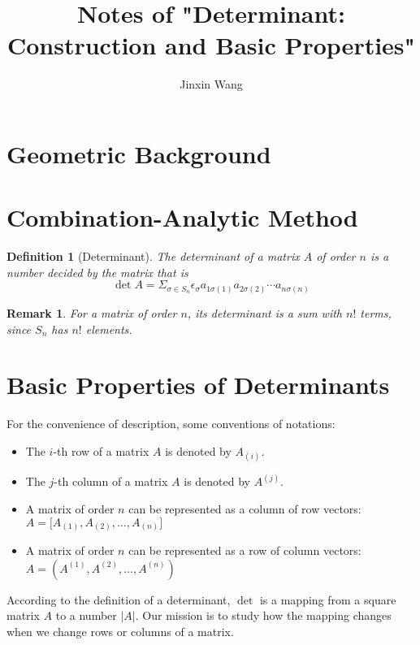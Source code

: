 \documentclass[onecolumn]{ctexart}
\title{Notes of "Determinant: Construction and Basic Properties"}
\author{Jinxin Wang}
\date{}
\newtheorem{definition}{Definition}
\newtheorem{remark}{Remark}
\begin{document}
\maketitle

\section{Geometric Background}

\section{Combination-Analytic Method}

\begin{definition}[Determinant]
  The determinant of a matrix $A$ of order $n$ is a number decided by the matrix 
  that is
  \begin{equation}
    \det A = \Sigma_{\sigma \in S_n} \epsilon_\sigma a_{1\sigma(1)} a_{2\sigma(2)} \cdots a_{n\sigma(n)}
  \end{equation}
\end{definition}
\begin{remark}
  For a matrix of order $n$, its determinant is a sum with $n!$ terms, since 
  $S_n$ has $n!$ elements.
\end{remark}

\section{Basic Properties of Determinants}

For the convenience of description, some conventions of notations:
\begin{itemize}
  \item The $i$-th row of a matrix $A$ is denoted by $A_{(i)}$.
  \item The $j$-th column of a matrix $A$ is denoted by $A^{(j)}$.
  \item A matrix of order $n$ can be represented as a column of row vectors: 
  $A = \lbrack A_{(1)}, A_{(2)}, \ldots, A_{(n)} \rbrack$
  \item A matrix of order $n$ can be represented as a row of column vectors: 
  $A = (A^{(1)}, A^{(2)}, \ldots, A^{(n)})$
\end{itemize}

According to the definition of a determinant, $\det$ is a mapping from a square 
matrix $A$ to a number $|A|$. Our mission is to study how the mapping changes 
when we change rows or columns of a matrix.
\end{document}
